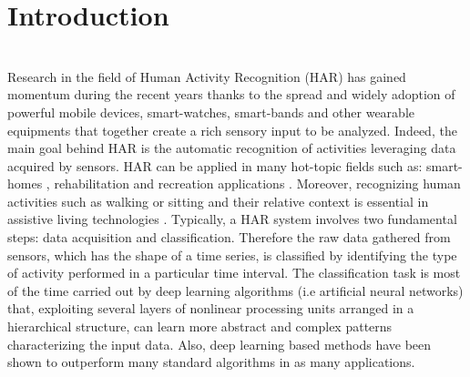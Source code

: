 
\section{Introduction}
\label{sec:introduction}

\\

Research in the field of Human Activity Recognition (HAR) has gained momentum during the recent years thanks to the spread and widely adoption of powerful mobile devices, smart-watches, smart-bands and other wearable equipments that together create a rich sensory input to be analyzed. Indeed, the main goal behind HAR is the automatic recognition of activities leveraging data acquired by sensors. HAR can be applied in many hot-topic fields such as: smart-homes \cite{Rashidi-2009}, rehabilitation \cite{Patel-2012} and recreation applications \cite{Lara-2013}. Moreover, recognizing human activities such as walking or sitting and their relative context is essential in assistive living technologies \cite{Avci-2010}. Typically, a HAR system involves two fundamental steps: data acquisition and classification. Therefore the raw data gathered from sensors, which has the shape of a time series, is classified by identifying the type of activity performed in a particular time interval. The classification task is most of the time carried out by deep learning algorithms (i.e artificial neural networks) that, exploiting several layers of nonlinear processing units arranged in a hierarchical structure, can learn more abstract and complex patterns characterizing the input data. Also, deep learning based methods have been shown to outperform many standard algorithms in as many applications.




